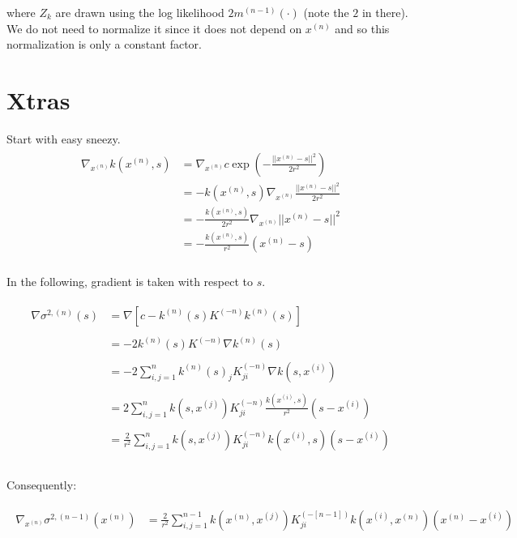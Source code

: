 \documentclass[paper=a4, fontsize=11pt]{scrartcl} %
\numberwithin{equation}{section} %
\numberwithin{figure}{section} %
\numberwithin{table}{section} %
\newcommand{\gxn}{\nabla_{x^{(n)}}} %
\newcommand{\xn}{x^{(n)}} %
\newcommand{\xj}{x^{(j)}}
\newcommand{\xii}{x^{(i)}}
\newcommand{\mnm}{m^{(n-1)}}
\newcommand{\kn}{k^{(n)}}
\newcommand{\Kinvn}{K^{(-n)}} %
\newcommand{\Kinvnm}{K^{(-[n-1])}}
\newcommand{\sqn}{\sigma ^{2 , (n)}     }
\newcommand{\signxn}{\sigma^{2, (n-1)} (\xn)}
\begin{document}
where $Z_k$ are drawn using the log likelihood $2\mnm(\cdot)$ (note the $2$ in there). We do not need to normalize it since it does not depend 
on $\xn$ and so this normalization is only a constant factor.


\section{Xtras}
Start with easy sneezy.
\begin{align}
 \begin{split}
  \gxn k(\xn,s) &= \gxn c\exp(-\frac{||\xn - s||^2}{2r^2} )\\
%
&= -k(\xn,s) \gxn\frac{||\xn - s||^2}{2r^2} \\
%
&= -\frac{k(\xn,s)}{2r^2} \gxn||\xn - s||^2 \\
%
&= -\frac{k(\xn ,s)}{r^2} (\xn-s)\\
 \end{split}
\end{align}

In the following, gradient is taken with respect to $s$.

\begin{align}
 \begin{split}
  \nabla \sqn (s) &= \nabla [ c - \kn(s) \Kinvn \kn(s)]\\\\
%
%
%
&= -2 \kn(s) \Kinvn \nabla\kn(s)\\\\
%
%
%
&= -2 \sum_{i,j=1}^{n} \kn(s)_j \Kinvn_{ji} \nabla k (s, \xii )\\\\
%
%
%
&= 2 \sum_{i,j=1}^{n} k(s,\xj) \Kinvn_{ji} \frac{k(\xii ,s)}{r^2} (s-\xii)\\\\
%
%
%
&= \frac{2}{r^2} \sum_{i,j=1}^{n} k(s,\xj) \Kinvn_{ji} k(\xii ,s) (s-\xii)\\\\
 \end{split}
\end{align}

Consequently:

\begin{align}
 \begin{split}
  \gxn \signxn &= \frac{2}{r^2} \sum_{i,j=1}^{n-1} k(\xn,\xj) \Kinvnm_{ji} k(\xii ,\xn) (\xn-\xii)\\\\
 \end{split}
\end{align}
\end{document}

